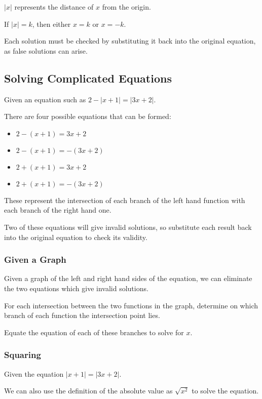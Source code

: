 \documentclass[a4paper,11pt]{article}
\begin{document}
$\lvert x \rvert$ represents the distance of $x$ from the origin.

If $\lvert x \rvert = k$, then either $x = k$ or $x = -k$.

Each solution must be checked by substituting it back into the original
equation, as false solutions can arise.


\subsection{Solving Complicated Equations}

Given an equation such as $2 - \lvert x + 1 \rvert = \lvert 3x + 2 \rvert$.

There are four possible equations that can be formed:

\begin{itemize}
\item $2 - (x + 1) = 3x + 2$
\item $2 - (x + 1) = -(3x + 2)$
\item $2 + (x + 1) = 3x + 2$
\item $2 + (x + 1) = -(3x + 2)$
\end{itemize}

These represent the intersection of each branch of the left hand function with
each branch of the right hand one.

Two of these equations will give invalid solutions, so substitute each result
back into the original equation to check its validity.


\subsubsection{Given a Graph}

Given a graph of the left and right hand sides of the equation, we can eliminate
the two equations which give invalid solutions.

For each intersection between the two functions in the graph, determine on which
branch of each function the intersection point lies.

Equate the equation of each of these branches to solve for $x$.


\subsubsection{Squaring}

Given the equation $\lvert x + 1 \rvert = \lvert 3x + 2 \rvert$.

We can also use the definition of the absolute value as $\sqrt{x^2}$ to solve
the equation.
\end{document}
